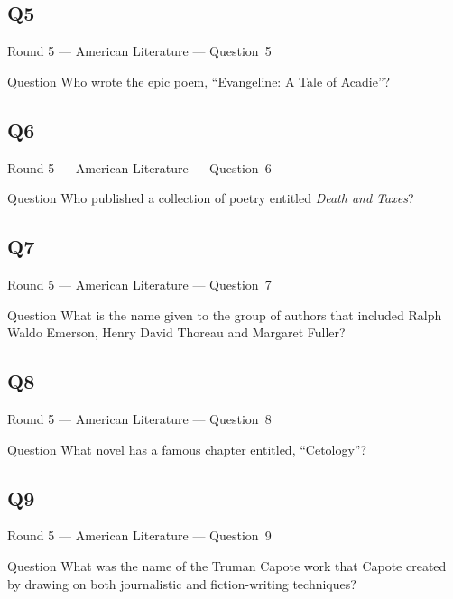 \documentclass[11pt]{beamer}
\begin{document}
\subsection*{Q5}
\begin{frame}[t]{Round 5 --- American Literature --- \mbox{Question 5}}
\vspace{-0.5em}
\begin{block}{Question}
Who wrote the epic poem, ``Evangeline: A Tale of Acadie''?
\end{block}
\end{frame}
\subsection*{Q6}
\begin{frame}[t]{Round 5 --- American Literature --- \mbox{Question 6}}
\vspace{-0.5em}
\begin{block}{Question}
Who published a collection of poetry entitled \emph{Death and Taxes}?
\end{block}
\end{frame}
\subsection*{Q7}
\begin{frame}[t]{Round 5 --- American Literature --- \mbox{Question 7}}
\vspace{-0.5em}
\begin{block}{Question}
What is the name given to the group of authors that included Ralph Waldo Emerson, Henry David Thoreau and Margaret Fuller?
\end{block}
\end{frame}
\subsection*{Q8}
\begin{frame}[t]{Round 5 --- American Literature --- \mbox{Question 8}}
\vspace{-0.5em}
\begin{block}{Question}
What novel has a famous chapter entitled, ``Cetology''?
\end{block}
\end{frame}
\subsection*{Q9}
\begin{frame}[t]{Round 5 --- American Literature --- \mbox{Question 9}}
\vspace{-0.5em}
\begin{block}{Question}
What was the name of the Truman Capote work that Capote created by drawing on both journalistic and fiction-writing techniques?
\end{block}
\end{frame}
\end{document}
